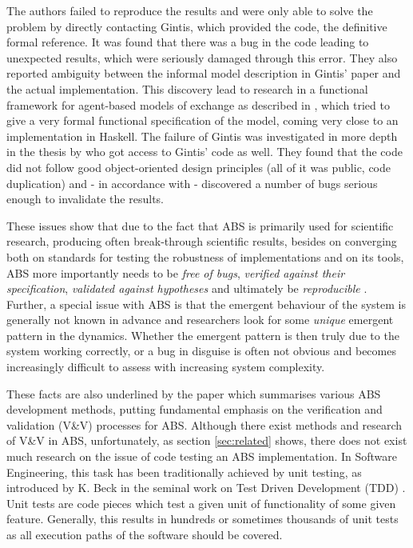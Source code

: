 The authors \cite{ionescu_dependently-typed_2012} failed to reproduce the results and were only able to solve the problem by directly contacting Gintis, which provided the code, the definitive formal reference. %
It was found that there was a bug in the code leading to unexpected results, which were seriously damaged through this error. They also reported ambiguity between the informal model description in Gintis' paper and the actual implementation.
This discovery lead to research in a functional framework for agent-based models of exchange as described in \cite{botta_functional_2011}, which tried to give a very formal functional specification of the model, coming very close to an implementation in Haskell. The failure of Gintis was investigated in more depth in the thesis by \cite{evensen_extensible_2010} who got access to Gintis' code as well. They found that the code did not follow good object-oriented design principles (all of it was public, code duplication) and - in accordance with \cite{ionescu_dependently-typed_2012} - discovered a number of bugs serious enough to invalidate the results.

These issues show that due to the fact that ABS is primarily used for scientific research, producing often break-through scientific results, besides on converging both on standards for testing the robustness of implementations and on its tools, ABS more importantly needs to be \textit{free of bugs}, \textit{verified against their specification}, \textit{validated against hypotheses} and ultimately be \textit{reproducible} \cite{axelrod_chapter_2006}. Further, a special issue with ABS is that the emergent behaviour of the system is generally not known in advance and researchers look for some \textit{unique} emergent pattern in the dynamics. Whether the emergent pattern is then truly due to the system working correctly, or a bug in disguise is often not obvious and becomes increasingly difficult to assess with increasing system complexity. 

These facts are also underlined by the paper \cite{hammer_tongs_north_2018} which summarises various ABS development methods, putting fundamental emphasis on the verification and validation (V\&V) processes for ABS. Although there exist methods and research of V\&V in ABS, unfortunately, as section \ref{sec:related} shows, there does not exist much research on the issue of code testing an ABS implementation. In Software Engineering, this task has been traditionally achieved by unit testing, as introduced by K. Beck in the seminal work on Test Driven Development (TDD) \cite{beck_test_2002}. Unit tests are code pieces which test a given unit of functionality of some given feature. Generally, this results in hundreds or sometimes thousands of unit tests as all execution paths of the software should be covered.

